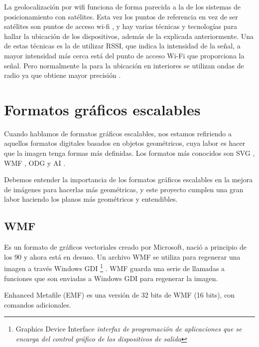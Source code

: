 La geolocalización por wifi funciona de forma parecida a la de los sistemas de posicionamiento con satélites. Esta vez los puntos de referencia en vez de ser satélites son puntos de acceso wi-fi \cite{luz_wi-fi_2017:a}, y hay varias técnicas y tecnologías para hallar la ubicación de los dispositivos, además de la explicada anteriormente. Una de estas técnicas es la de utilizar RSSI, que indica la intensidad de la señal, a mayor intensidad más cerca está del punto de acceso Wi-Fi que proporciona la señal.  Pero normalmente la para la ubicación en interiores se utilizan ondas de radio ya que obtiene mayor precisión \cite{noauthor_mejores_nodate:a}. 

\section{Formatos gráficos escalables}\label{formatos-graficos-escalables}


Cuando hablamos de formatos gráficos escalables, nos estamos refiriendo a aquellos formatos digitales basados en objetos geométricos, cuya labor es hacer que la imagen tenga formas m\'{a}s definidas.
Los formatos más conocidos son SVG \cite{noauthorcursonodate:a}, WMF \cite{noauthor_metaarchivo_2016:a}, ODG \cite{noauthor_definicion_nodate:c} y AI \cite{noauthorextensionnodate:b}.

Debemos entender la importancia de los formatos gráficos escalables en la mejora de imágenes para hacerlas más geométricas, y este proyecto cumplen una gran labor haciendo los planos más geométricos y entendibles.


\subsection{WMF}\label{wmf}


Es un formato de gr\'{a}ficos vectoriales creado por Microsoft, naci\'{o} a principio de los 90 y ahora est\'{a} en desuso. Un archivo WMF se utiliza para regenerar una imagen a trav\'{e}s Windows GDI \footnote{Graphics Device Interface \textit{interfaz de programaci\'{o}n de aplicaciones que se encarga del control gr\'{a}fico de los dispositivos de salida}} \hypertarget{_Hlk482387012}{. WMF guarda una serie de llamadas a funciones que son enviadas a Windows GDI para regenerar la imagen.}

Enhanced Metafile (EMF) es una versi\'{o}n de 32 bits de WMF (16 bits), con comandos adicionales.



